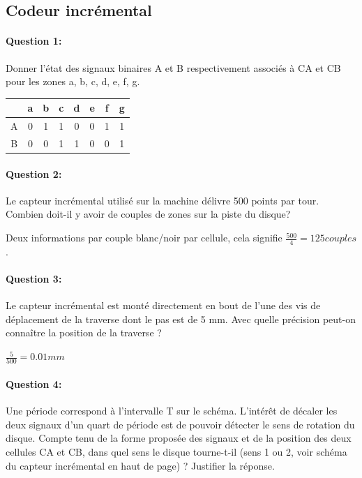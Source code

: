 \subsection{Codeur incrémental}

\paragraph{Question 1:} Donner l'état des signaux binaires A et B respectivement associés à CA et CB pour les zones a, b, c, d, e, f, g.

\begin{center}
\begin{tabular}{|c|c|c|c|c|c|c|c|}
\hline
  & a & b & c & d & e & f & g \\
\hline
A & 0 & 1 & 1 & 0 & 0 & 1 & 1 \\
\hline
B & 0 & 0 & 1 & 1 & 0 & 0 & 1 \\
\hline
\end{tabular}
\end{center}

\paragraph{Question 2:} Le capteur incrémental utilisé sur la machine délivre 500 points par tour. Combien doit-il y avoir de couples de zones sur la piste du disque?

Deux informations par couple blanc/noir par cellule, cela signifie $\frac{500}{4}=125 couples$.

\paragraph{Question 3:} Le capteur incrémental est monté directement en bout de l'une des vis de déplacement de la traverse dont le pas est de 5 mm. Avec quelle précision peut-on connaître la position de la traverse ?

$\frac{5}{500}=0.01mm$

\paragraph{Question 4:} Une période correspond à l'intervalle T sur le schéma. L'intérêt de décaler les deux signaux d'un quart de période est de pouvoir détecter le sens de rotation du disque. Compte tenu de la forme proposée des signaux et de la position des deux cellules CA et CB, dans quel sens le disque tourne-t-il (sens 1 ou 2, voir schéma du capteur incrémental en haut de page) ? Justifier la réponse. 

